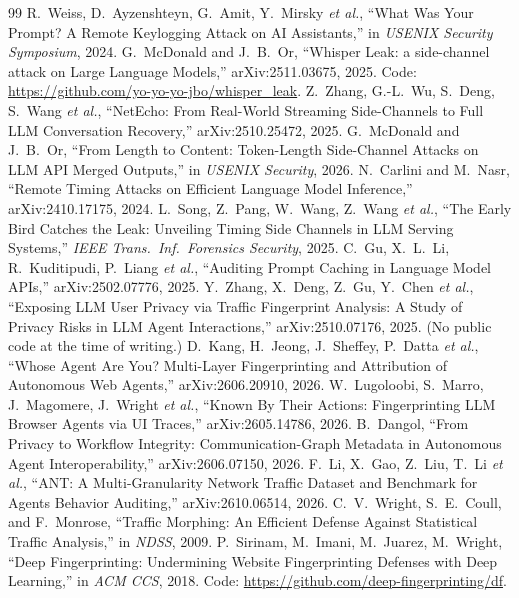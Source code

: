 \documentclass[journal]{IEEEtran}
\begin{document}
\begin{thebibliography}{99}
 R.~Weiss, D.~Ayzenshteyn, G.~Amit, Y.~Mirsky \emph{et al.}, ``What Was Your Prompt? A Remote Keylogging Attack on AI Assistants,'' in \emph{USENIX Security Symposium}, 2024.
 G.~McDonald and J.~B.~Or, ``Whisper Leak: a side-channel attack on Large Language Models,'' arXiv:2511.03675, 2025. Code: \url{https://github.com/yo-yo-yo-jbo/whisper_leak}.
 Z.~Zhang, G.-L.~Wu, S.~Deng, S.~Wang \emph{et al.}, ``NetEcho: From Real-World Streaming Side-Channels to Full LLM Conversation Recovery,'' arXiv:2510.25472, 2025.
 G.~McDonald and J.~B.~Or, ``From Length to Content: Token-Length Side-Channel Attacks on LLM API Merged Outputs,'' in \emph{USENIX Security}, 2026.
 N.~Carlini and M.~Nasr, ``Remote Timing Attacks on Efficient Language Model Inference,'' arXiv:2410.17175, 2024.
 L.~Song, Z.~Pang, W.~Wang, Z.~Wang \emph{et al.}, ``The Early Bird Catches the Leak: Unveiling Timing Side Channels in LLM Serving Systems,'' \emph{IEEE Trans.\ Inf.\ Forensics Security}, 2025.
 C.~Gu, X.~L.~Li, R.~Kuditipudi, P.~Liang \emph{et al.}, ``Auditing Prompt Caching in Language Model APIs,'' arXiv:2502.07776, 2025.
 Y.~Zhang, X.~Deng, Z.~Gu, Y.~Chen \emph{et al.}, ``Exposing LLM User Privacy via Traffic Fingerprint Analysis: A Study of Privacy Risks in LLM Agent Interactions,'' arXiv:2510.07176, 2025. (No public code at the time of writing.)
 D.~Kang, H.~Jeong, J.~Sheffey, P.~Datta \emph{et al.}, ``Whose Agent Are You? Multi-Layer Fingerprinting and Attribution of Autonomous Web Agents,'' arXiv:2606.20910, 2026.
 W.~Lugoloobi, S.~Marro, J.~Magomere, J.~Wright \emph{et al.}, ``Known By Their Actions: Fingerprinting LLM Browser Agents via UI Traces,'' arXiv:2605.14786, 2026.
 B.~Dangol, ``From Privacy to Workflow Integrity: Communication-Graph Metadata in Autonomous Agent Interoperability,'' arXiv:2606.07150, 2026.
 F.~Li, X.~Gao, Z.~Liu, T.~Li \emph{et al.}, ``ANT: A Multi-Granularity Network Traffic Dataset and Benchmark for Agents Behavior Auditing,'' arXiv:2610.06514, 2026.
 C.~V.~Wright, S.~E.~Coull, and F.~Monrose, ``Traffic Morphing: An Efficient Defense Against Statistical Traffic Analysis,'' in \emph{NDSS}, 2009.
 P.~Sirinam, M.~Imani, M.~Juarez, M.~Wright, ``Deep Fingerprinting: Undermining Website Fingerprinting Defenses with Deep Learning,'' in \emph{ACM CCS}, 2018. Code: \url{https://github.com/deep-fingerprinting/df}.

\end{thebibliography}
\end{document}
